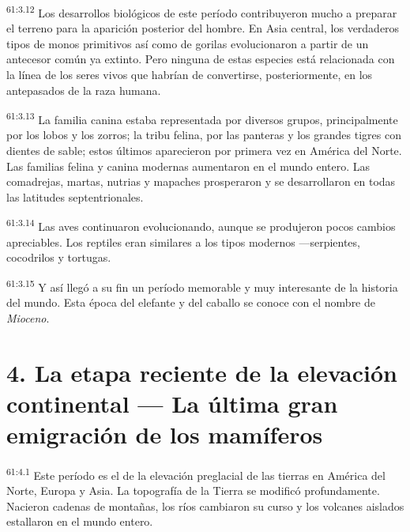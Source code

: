 \par
\textsuperscript{61:3.12} Los desarrollos biológicos de este período contribuyeron mucho a preparar el terreno para la aparición posterior del hombre. En Asia central, los verdaderos tipos de monos primitivos así como de gorilas evolucionaron a partir de un antecesor común ya extinto. Pero ninguna de estas especies está relacionada con la línea de los seres vivos que habrían de convertirse, posteriormente, en los antepasados de la raza humana.

\par
\textsuperscript{61:3.13} La familia canina estaba representada por diversos grupos, principalmente por los lobos y los zorros; la tribu felina, por las panteras y los grandes tigres con dientes de sable; estos últimos aparecieron por primera vez en América del Norte. Las familias felina y canina modernas aumentaron en el mundo entero. Las comadrejas, martas, nutrias y mapaches prosperaron y se desarrollaron en todas las latitudes septentrionales.

\par
\textsuperscript{61:3.14} Las aves continuaron evolucionando, aunque se produjeron pocos cambios apreciables. Los reptiles eran similares a los tipos modernos ---serpientes, cocodrilos y tortugas.

\par
\textsuperscript{61:3.15} Y así llegó a su fin un período memorable y muy interesante de la historia del mundo. Esta época del elefante y del caballo se conoce con el nombre de \textit{Mioceno}.

\section*{4. La etapa reciente de la elevación continental --- La última gran emigración de los mamíferos}
\par
\textsuperscript{61:4.1} Este período es el de la elevación preglacial de las tierras en América del Norte, Europa y Asia. La topografía de la Tierra se modificó profundamente. Nacieron cadenas de montañas, los ríos cambiaron su curso y los volcanes aislados estallaron en el mundo entero.

